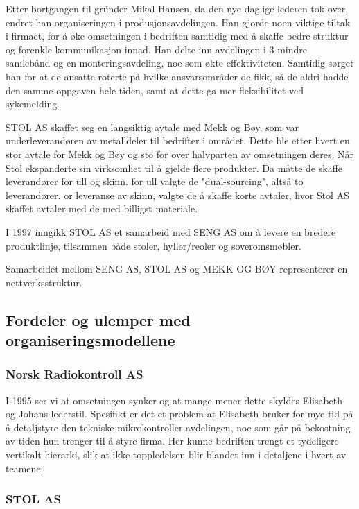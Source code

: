 Etter bortgangen til gründer Mikal Hansen, da den nye daglige lederen tok over, endret han organiseringen i produsjonsavdelingen.
Han gjorde noen viktige tiltak i firmaet, for å øke omsetningen i bedriften samtidig med å skaffe bedre struktur og forenkle kommunikasjon innad.
Han delte inn avdelingen i 3 mindre samlebånd og en monteringsavdeling, noe som økte effektiviteten. Samtidig sørget han for at de ansatte roterte på hvilke ansvarsområder de fikk, så de aldri hadde den samme oppgaven hele tiden, samt at dette ga mer fleksibilitet ved sykemelding.

STOL AS skaffet seg en langsiktig avtale med Mekk og Bøy, som var underleverandøren av metalldeler til bedrifter i området. Dette ble etter hvert en stor avtale for Mekk og Bøy og sto for over halvparten av omsetningen deres. Når Stol ekspanderte sin virksomhet til å gjelde flere produkter. Da måtte de skaffe leverandører for ull og skinn. for ull valgte de "dual-sourcing", altså to leverandører. or leveranse av skinn, valgte de å skaffe korte avtaler, hvor Stol AS skaffet avtaler med de med billigst materiale.

I 1997 inngikk STOL AS et samarbeid med SENG AS om å levere en bredere produktlinje, tilsammen både stoler, hyller/reoler og soveromsmøbler.

Samarbeidet mellom SENG AS, STOL AS og MEKK OG BØY representerer en nettverksstruktur.

\subsection{Fordeler og ulemper med organiseringsmodellene}

\subsubsection{Norsk Radiokontroll AS}

I 1995 ser vi at omsetningen synker og at mange mener dette skyldes Elisabeth og Johans lederstil. Spesifikt er det et problem at Elisabeth bruker for mye tid på å detaljstyre den tekniske mikrokontroller-avdelingen, noe som går på bekostning av tiden hun trenger til å styre firma.
Her kunne bedriften trengt et tydeligere vertikalt hierarki, slik at ikke toppledelsen blir blandet inn i detaljene i hvert av teamene.

\subsubsection{STOL AS}

